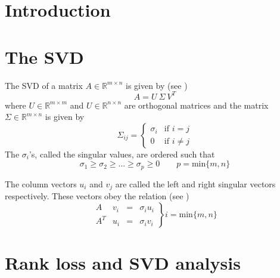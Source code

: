 \documentclass [english,memo]{xarticle}
\newcommand{\Rbb}{\mathbb{R}}
\begin{document}
\author{Rob van Harrevelt}
\date{\today}
%
\maketitle
%


\section{Introduction}

\section{The SVD}

The SVD of a matrix $A \in \Rbb^{m \times n}$ is given by (see \cite{matcomp})
\begin{equation}
A = U \: \Sigma \: V^T
\end{equation}
where $U \in \Rbb^{m \times m}$ and  $U \in \Rbb^{n \times n}$ are
orthogonal matrices and the matrix $\Sigma \in \Rbb^{m \times n}$
is given by
\begin{equation}
\Sigma_{ij} = \begin{cases}
               \sigma_i & \text{if $i = j$} \\
	       0 & \text{if $i \neq j$}
              \end{cases}
\end{equation}
The $\sigma_i$'s, called the singular values, are ordered such that
\begin{equation}
\sigma_1 \ge \sigma_2 \ge ... \ge \sigma_p \ge 0  \qquad p = \text{min}\{m, n\}
\end{equation}

The column vectors $u_i$ and $v_j$ are called the left and right singular
vectors respectively. These vectors obey the relation
(see \cite{matcomp})
\begin{equation}\label{eq:singular_vectors}
\left.
\begin{array}{llcl}
A   & v_i & = & \sigma_i u_i \\
A^T & u_i & = & \sigma_i v_i
\end{array}
\right\}
i = \text{min}\{m, n\}
\end{equation}

\section{Rank loss and SVD analysis}
\end{document}
